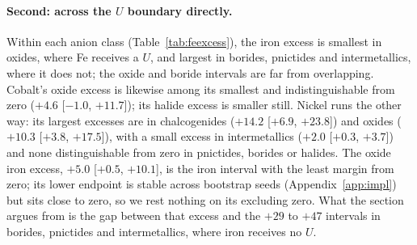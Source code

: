 \documentclass[11pt]{article}
\begin{document}
\paragraph{Second: across the $U$ boundary directly.} Within each anion class
(Table~\ref{tab:feexcess}), the iron excess is smallest in oxides, where Fe receives a
$U$, and largest in borides, pnictides and intermetallics, where it does not; the oxide
and boride intervals are far from overlapping. Cobalt's oxide excess is likewise among its smallest and indistinguishable from zero
($+4.6$ [$-1.0$, $+11.7$]); its halide excess is smaller still. Nickel runs the other
way: its largest excesses are in chalcogenides ($+14.2$ [$+6.9$, $+23.8$]) and oxides
($+10.3$ [$+3.8$, $+17.5$]), with a small excess in intermetallics ($+2.0$ [$+0.3$,
$+3.7$]) and none distinguishable from zero in pnictides, borides or halides. The oxide iron
excess, $+5.0$ [$+0.5$, $+10.1$], is the iron interval with the least margin from zero; its lower
endpoint is stable across bootstrap seeds (Appendix~\ref{app:impl}) but sits close to
zero, so we rest nothing on its excluding zero. What the section argues from is the gap
between that excess and the $+29$ to $+47$ intervals in borides, pnictides and
intermetallics, where iron receives no $U$.
\end{document}
